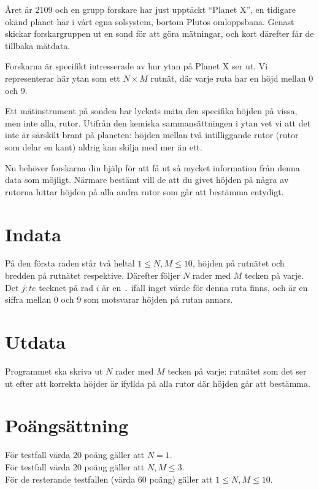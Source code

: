 Året är 2109 och en grupp forskare har just upptäckt ``Planet X'', 
en tidigare okänd planet här i vårt egna solsystem,
bortom Plutos omloppsbana. Genast skickar forskargruppen ut
en sond för att göra mätningar, och kort därefter får de tillbaka mätdata.

Forskarna är specifikt intresserade av hur ytan på Planet X ser ut.
Vi representerar här ytan som ett $N \times M$ rutnät, där varje ruta
har en höjd mellan 0 och 9.

Ett mätinstrument på sonden har lyckats mäta den specifika höjden
på vissa, men inte alla, rutor. Utifrån den kemiska sammansättningen i ytan vet vi att det inte 
är särskilt brant på planeten: höjden mellan två
intilliggande rutor (rutor som delar en kant) aldrig kan skilja 
med mer än ett. 

Nu behöver forskarna din hjälp för att få ut så mycket information
från denna data som möjligt. Närmare bestämt vill de att du givet höjden
på några av rutorna hittar höjden på alla andra rutor som går att bestämma entydigt.

\section*{Indata}
På den första raden står två heltal $1 \le N,M \le 10$, 
höjden på rutnätet och bredden på rutnätet respektive.
Därefter följer $N$ rader med $M$ tecken på varje.
Det $j:te$ tecknet på rad $i$ är en \texttt{.} ifall
inget värde för denna ruta finns, och är en siffra mellan
0 och 9 som motsvarar höjden på rutan annars.

\section*{Utdata}
Programmet ska skriva ut $N$ rader med $M$ tecken på varje:
rutnätet som det ser ut efter att
korrekta höjder är ifyllda på alla rutor där höjden går att bestämma.

\section*{Poängsättning}
För testfall värda $20$ poäng gäller att $N=1$. \\
För testfall värda $20$ poäng gäller att $N,M \leq 3$. \\
För de resterande testfallen (värda $60$ poäng) gäller att $1\leq N,M \leq 10$.

